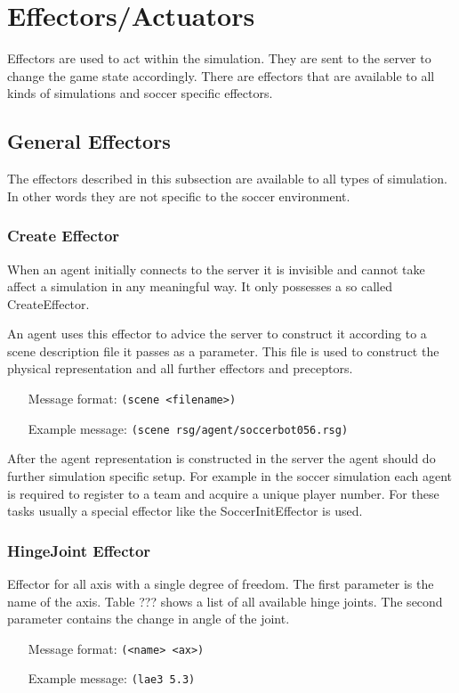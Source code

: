 \section{Effectors/Actuators}
Effectors are used to act within the simulation. They are sent to the server
to change the game state accordingly. There are effectors that are available to
all kinds of simulations and soccer specific effectors.

\subsection{General Effectors}
The effectors described in this subsection are available to all types of
simulation. In other words they are not specific to the soccer environment.

\subsubsection{Create Effector}

When an agent initially connects to the server it is invisible and
cannot take affect a simulation in any meaningful way. It only
possesses a so called CreateEffector.

An agent uses this effector to advice the server to construct it
according to a scene description file it passes as a parameter. This
file is used to construct the physical representation and all further
effectors and preceptors.
\begin{itemize}
	\item[Message format:] \texttt{(scene  <filename>)}
	\item[Example message:] \texttt{(scene rsg/agent/soccerbot056.rsg)}
\end{itemize}

After the agent representation is constructed in the server the agent
should do further simulation specific setup. For example in the soccer
simulation each agent is required to register to a team and acquire a
unique player number. For these tasks usually a special effector like
the SoccerInitEffector is used.


\subsubsection{HingeJoint Effector}
Effector for all axis with a single degree of freedom.
The first parameter is the name of the axis. Table ??? shows a list of all
available hinge joints. The second parameter contains the change in angle of
the joint.
\begin{itemize}
	\item[Message format:] \texttt{(<name> <ax>)}
	\item[Example message:] \texttt{(lae3 5.3)}
\end{itemize}

